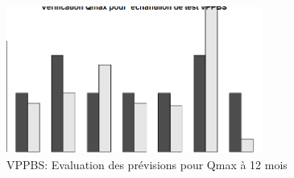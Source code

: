 \begin{figure}[H]
\centering
\includegraphics[width=0.75\textwidth]{../Fig/VPPBS/vppbs-regtree-test-qmax12.png}
\caption{VPPBS: Evaluation des prévisions pour Qmax à 12 mois}
\label{fig-vppbs-regtree-test-qmax12}
\end{figure}

